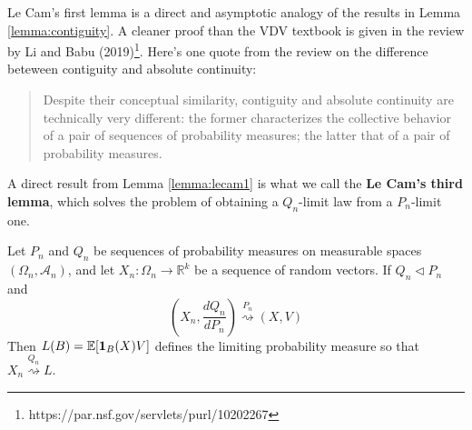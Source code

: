 \documentclass{article}
\begin{document}
Le Cam's first lemma is a direct and asymptotic analogy of the results in Lemma \ref{lemma:contiguity}. A cleaner proof than the VDV textbook is given in the review by Li and Babu (2019)\footnote{https://par.nsf.gov/servlets/purl/10202267}. Here's one quote from the review on the difference beteween contiguity and absolute continuity:
\begin{quote}
    Despite their conceptual similarity, contiguity and absolute continuity are technically very different: the former characterizes the collective behavior of a pair of sequences of probability measures; the latter that of a pair of probability measures.
\end{quote}
A direct result from Lemma \ref{lemma:lecam1} is what we call the \textbf{Le Cam's third lemma}, which solves the problem of obtaining a $Q_n$-limit law from a $P_n$-limit one.
\begin{lemma}
    Let \(P_n\) and \(Q_n\) be sequences of probability measures on measurable spaces \((\Omega_n, \mathcal{A}_n)\), and let $X_n: \Omega_n \to \mathbb{R}^k$ be a sequence of random vectors. If \(Q_n \triangleleft P_n\) and 
    \begin{equation}
        \left( X_n, \frac{dQ_n}{dP_n} \right) \overset{P_n}{\rightsquigarrow} (X, V)
    \end{equation}
    Then $L(B) = \mathbb{E} [\mathbf{1}_B(X)V]$ defines the limiting probability measure so that $X_n \overset{Q_n}{\rightsquigarrow} L$.
\end{lemma}  
\end{document}
